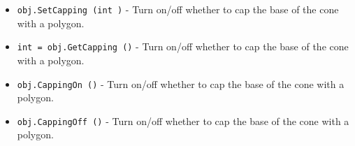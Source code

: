 \begin{itemize}
\item  \verb|obj.SetCapping (int )| -  Turn on/off whether to cap the base of the cone with a polygon.

\item  \verb|int = obj.GetCapping ()| -  Turn on/off whether to cap the base of the cone with a polygon.

\item  \verb|obj.CappingOn ()| -  Turn on/off whether to cap the base of the cone with a polygon.

\item  \verb|obj.CappingOff ()| -  Turn on/off whether to cap the base of the cone with a polygon.

\end{itemize}

